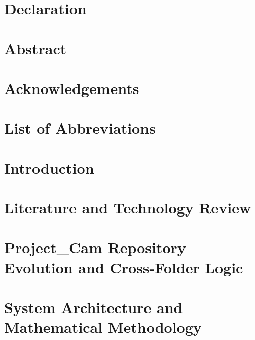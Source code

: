 \documentclass[12pt,a4paper]{report}
\begin{document}


\clearpage
\thispagestyle{empty}
\chapter*{Declaration}


\clearpage
\setcounter{page}{2}
\chapter*{Abstract}


\clearpage
\chapter*{Acknowledgements}


\clearpage
\tableofcontents
\clearpage
\chapter*{List of Abbreviations}

\clearpage
\listoftables
\clearpage
\listoffigures

\clearpage
\chapter{Introduction}


\clearpage
\chapter{Literature and Technology Review}


\clearpage
\chapter{Project\_Cam Repository Evolution and Cross-Folder Logic}


\clearpage
\chapter{System Architecture and Mathematical Methodology}


\clearpage
\end{document}

